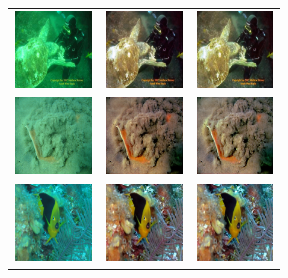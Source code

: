 \documentclass[letterpaper, 10pt, conference]{ieeeconf}
\begin{document}
\begin{figure}
\begin{tabular}{p{1.7cm} p{1.7cm} p{1.7cm}}
   \includegraphics[width=0.8in]{n01664065_29738_real} &
   \includegraphics[width=0.8in]{n01664065_29738_gen_0} &
   \includegraphics[width=0.8in]{n01664065_29738_gen_1} \\
   
   \includegraphics[width=0.8in]{n01496331_11938_real} &
   \includegraphics[width=0.8in]{n01496331_11938_gen_0} &
   \includegraphics[width=0.8in]{n01496331_11938_gen_1} \\
   
   \includegraphics[width=0.8in]{n02606052_2969_real} &
   \includegraphics[width=0.8in]{n02606052_2969_gen_0} &
   \includegraphics[width=0.8in]{n02606052_2969_gen_1} \\
   

\end{tabular}
\end{figure}
\end{document}

